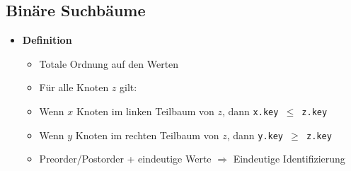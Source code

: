 \subsection{Binäre Suchbäume}
    \begin{itemize}
        \item \textbf{Definition}
            \begin{itemize}
                \item Totale Ordnung auf den Werten 
                \item Für alle Knoten $z$ gilt:
                \item[] Wenn $x$ Knoten im linken Teilbaum von $z$, dann \texttt{x.key $\leq$ z.key}
                \item[] Wenn $y$ Knoten im rechten Teilbaum von $z$, dann \texttt{y.key $\geq$ z.key} 
                \item Preorder/Postorder + eindeutige Werte $\Rightarrow$ Eindeutige Identifizierung 
            \end{itemize}
        

\end{itemize}
